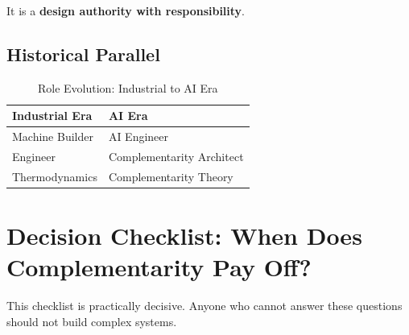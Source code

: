 \noindent It is a \textbf{design authority with responsibility}.

\subsection{Historical Parallel}

\begin{table}[htbp]
\centering
\caption{Role Evolution: Industrial to AI Era}
\label{tab:role-evolution}
\renewcommand{\arraystretch}{1.3}
\begin{tabular}{@{}ll@{}}
\toprule
\textbf{Industrial Era} & \textbf{AI Era} \\
\midrule
Machine Builder & AI Engineer \\
Engineer & Complementarity Architect \\
Thermodynamics & Complementarity Theory \\
\bottomrule
\end{tabular}
\end{table}


\section{Decision Checklist: When Does Complementarity Pay Off?}
\label{sec:thermo-checklist}

This checklist is practically decisive. Anyone who cannot answer these questions
should not build complex systems.

